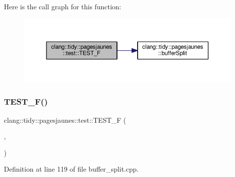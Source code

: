 Here is the call graph for this function\+:
\nopagebreak
\begin{figure}[H]
\begin{center}
\leavevmode
\includegraphics[width=350pt]{namespaceclang_1_1tidy_1_1pagesjaunes_1_1test_ad2c5a5690cd7d1cada077f8555327570_cgraph}
\end{center}
\end{figure}
\mbox{\label{namespaceclang_1_1tidy_1_1pagesjaunes_1_1test_ae780e29f506c788f65df42a334447da4}} 
\subsubsection{\texorpdfstring{T\+E\+S\+T\+\_\+\+F()}{TEST\_F()}\hspace{0.1cm}{\footnotesize\ttfamily [30/57]}}
{\footnotesize\ttfamily clang\+::tidy\+::pagesjaunes\+::test\+::\+T\+E\+S\+T\+\_\+F (\begin{DoxyParamCaption}\item[{\hyperlink{classclang_1_1tidy_1_1pagesjaunes_1_1test_1_1_buffer_split_test}{Buffer\+Split\+Test}}]{,  }\item[{One\+Empty\+Line\+Buffer}]{ }\end{DoxyParamCaption})}



Definition at line 119 of file buffer\+\_\+split.\+cpp.

